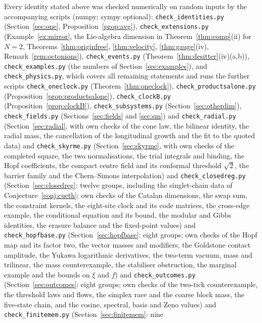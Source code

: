 \documentclass[aps,pra,onecolumn,superscriptaddress,nofootinbib,10pt]{revtex4-2}
\theoremstyle{definition}
\theoremstyle{remark}
\begin{document}
{\sloppy Every identity stated above was checked numerically on random inputs by the accompanying
scripts (numpy; sympy optional): \texttt{check\_identities.py} (Section~\ref{sec:one}, Proposition~\ref{prop:avg}),
\texttt{check\_extensions.py} (Example~\ref{ex:mirror}, the Lie-algebra dimension in
Theorem~\ref{thm:comp}(ii) for $N=2$, Theorems~\ref{thm:originfree}, \ref{thm:velocity},
\ref{thm:gauge}(iv), Remark~\ref{rem:octonions}), \texttt{check\_events.py}
(Theorem~\ref{thm:desitter}(iv)(a,b)), \texttt{check\_examples.py} (the numbers of Section~\ref{sec:examples}),
and \texttt{check\_physics.py}, which covers all remaining statements and runs the further scripts
\texttt{check\_oneclock.py} (Theorem~\ref{thm:oneclock}), \texttt{check\_productsalone.py}
(Proposition~\ref{prop:productsalone}), \texttt{check\_clockB.py} (Proposition~\ref{prop:clockB}),
\texttt{check\_subsystems.py} (Section~\ref{sec:otherdim}), \texttt{check\_fields.py} (Sections~\ref{sec:fields}
and \ref{sec:sm}) and \texttt{check\_radial.py} (Section~\ref{sec:radial}, with own checks of the cone law, the
bilinear identity, the radial mass, the cancellation of the longitudinal growth and the fit to the
quoted data) and \texttt{check\_skyrme.py} (Section~\ref{sec:skyrme}, with own checks of the completed square, the
two normalisations, the trial integrals and binding, the Hopf coefficients, the compact centre field and
its conformal threshold $\sqrt2$, the barrier family and the Chern--Simons interpolation) and \texttt{check\_closedreg.py}
(Section~\ref{sec:closedreg}: twelve groups, including the singlet-chain data of Conjecture~\ref{conj:cueth}; own checks of the
Catalan dimensions, the swap sum, the constraint kernels, the eight-site clock and its code matrices, the
cross-edge example, the conditional equation and its bound, the modular and Gibbs identities, the
erasure balance and the fixed-point values) and \texttt{check\_hopfbase.py} (Section~\ref{sec:hopfbase}: eight groups;
own checks of the Hopf map and its factor two, the vector masses and modifiers, the Goldstone contact
amplitude, the Yukawa logarithmic derivatives, the two-term vacuum, mass and trilinear, the mass
counterexample, the stabiliser obstruction, the marginal example and the bounds on $\xi$ and $f$) and
\texttt{check\_outcomes.py} (Section~\ref{sec:outcomes}: eight groups; own checks of the two-tick counterexample,
the threshold laws and flows, the simplex race and the coarse block mass, the five-state chain, and
the cosine, spectral, basis and Zeno values) and \texttt{check\_finitemem.py} (Section~\ref{sec:finitemem}: nine
}
\end{document}
